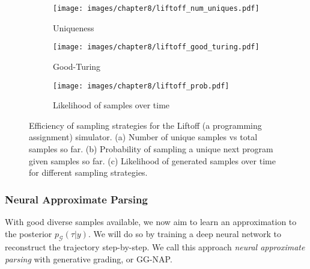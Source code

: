 \begin{figure}
    \centering
    \begin{subfigure}{0.49\linewidth}
        \centering
        \texttt{[image: images/chapter8/liftoff\_num\_uniques.pdf]}
        \caption{Uniqueness}
    \end{subfigure}
    \begin{subfigure}{0.49\linewidth}
        \centering
        \texttt{[image: images/chapter8/liftoff\_good\_turing.pdf]}
        \caption{Good-Turing}   
    \end{subfigure}    
    \begin{subfigure}{0.95\linewidth}
        \texttt{[image: images/chapter8/liftoff\_prob.pdf]}
        \caption{Likelihood of samples over time}
    \end{subfigure}  
    \caption{ Efficiency of sampling strategies for the Liftoff (a programming assignment) simulator. (a) Number of unique samples vs total samples so far. (b) Probability of sampling a unique next program given samples so far. (c) Likelihood of generated samples over time for different sampling strategies.} 
    \label{fig:sampling_analysis}
\end{figure}


\subsubsection{Neural Approximate Parsing}

With good diverse samples available, we now aim to learn an approximation to 
the posterior $p_\mathcal{G}(\tau | y)$.
We will do so by training a deep neural network to reconstruct the trajectory step-by-step.
We call this approach \textit{neural approximate parsing} with generative grading, or GG-NAP. 

